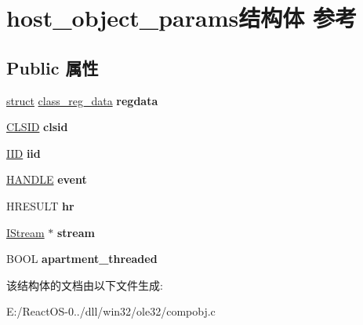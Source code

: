 \hypertarget{structhost__object__params}{}\section{host\+\_\+object\+\_\+params结构体 参考}
\label{structhost__object__params}
\subsection*{Public 属性}
\begin{DoxyCompactItemize}
\item 
\mbox{\label{structhost__object__params_a921db70e0826f72d584721de7d1bb719}} 
\hyperlink{interfacestruct}{struct} \hyperlink{structclass__reg__data}{class\+\_\+reg\+\_\+data} {\bfseries regdata}
\item 
\mbox{\label{structhost__object__params_a38df900023913c8a42c5b2700b170c66}} 
\hyperlink{struct___i_i_d}{C\+L\+S\+ID} {\bfseries clsid}
\item 
\mbox{\label{structhost__object__params_ae4337d1d4d078eb01f3f058e1bdbfbb5}} 
\hyperlink{struct___i_i_d}{I\+ID} {\bfseries iid}
\item 
\mbox{\label{structhost__object__params_aa9e6a71ee19e32987a5f228e39476719}} 
\hyperlink{interfacevoid}{H\+A\+N\+D\+LE} {\bfseries event}
\item 
\mbox{\label{structhost__object__params_a5d9a28fd13beb66912600cccaa039563}} 
H\+R\+E\+S\+U\+LT {\bfseries hr}
\item 
\mbox{\label{structhost__object__params_aefc0b5d5eb47b74f832c83c64b1b1d9b}} 
\hyperlink{interface_i_stream}{I\+Stream} $\ast$ {\bfseries stream}
\item 
\mbox{\label{structhost__object__params_a0da31035d2ff8011a392bac8f5d47123}} 
B\+O\+OL {\bfseries apartment\+\_\+threaded}
\end{DoxyCompactItemize}


该结构体的文档由以下文件生成\+:\begin{DoxyCompactItemize}
\item 
E\+:/\+React\+O\+S-\/0../dll/win32/ole32/compobj.\+c\end{DoxyCompactItemize}
